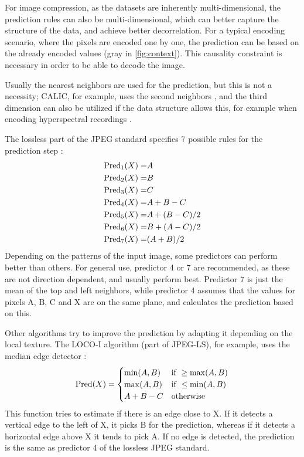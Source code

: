       For image compression, as the datasets are inherently multi-dimensional, the prediction rules can also be multi-dimensional, which can better capture the structure of the data, and achieve better decorrelation. For a typical encoding scenario, where the pixels are encoded one by one, the prediction can be based on the already encoded values (gray in \autoref{fig:context}). This causality constraint is necessary in order to be able to decode the image.

      Usually the nearest neighbors are used for the prediction, but this is not a necessity; CALIC, for example, uses the second neighbors \cite{wu_context-based_1997}, and the third dimension can also be utilized if the data structure allows this, for example when encoding hyperspectral recordings \cite{aranki_hardware_2009}.

      The lossless part of the JPEG standard specifies 7 possible rules for the prediction step \cite{pennebaker_jpeg:_1992}:
      \begin{align*}
        \operatorname{Pred}_1(X) =& A \\
        \operatorname{Pred}_2(X) =& B \\
        \operatorname{Pred}_3(X) =& C \\
        \operatorname{Pred}_4(X) =& A + B - C \\
        \operatorname{Pred}_5(X) =& A + (B - C)/2 \\
        \operatorname{Pred}_6(X) =& B + (A - C)/2 \\
        \operatorname{Pred}_7(X) =& (A + B)/2 \\
      \end{align*}
      Depending on the patterns of the input image, some predictors can perform better than others. For general use, predictor 4 or 7 are recommended, as these are not direction dependent, and usually perform best. Predictor 7 is just the mean of the top and left neighbors, while predictor 4 assumes that the values for pixels A, B, C and X are on the same plane, and calculates the prediction based on this. 

      Other algorithms try to improve the prediction by adapting it depending on the local texture. The LOCO-I algorithm (part of JPEG-LS), for example, uses the median edge detector \cite{weinberger_loco-i_2000}:
      \begin{equation}
        \operatorname{Pred}(X) = 
        \begin{cases}
          \min(A,B) & \text{if } \geq \max(A,B) \\
          \max(A,B) & \text{if } \leq \min(A,B) \\
          A + B - C & \text{otherwise }
        \end{cases}
      \end{equation}
      This function tries to estimate if there is an edge close to X. If it detects a vertical edge to the left of X, it picks B for the prediction, whereas if it detects a horizontal edge above X it tends to pick A. If no edge is detected, the prediction is the same as predictor 4 of the lossless JPEG standard.

